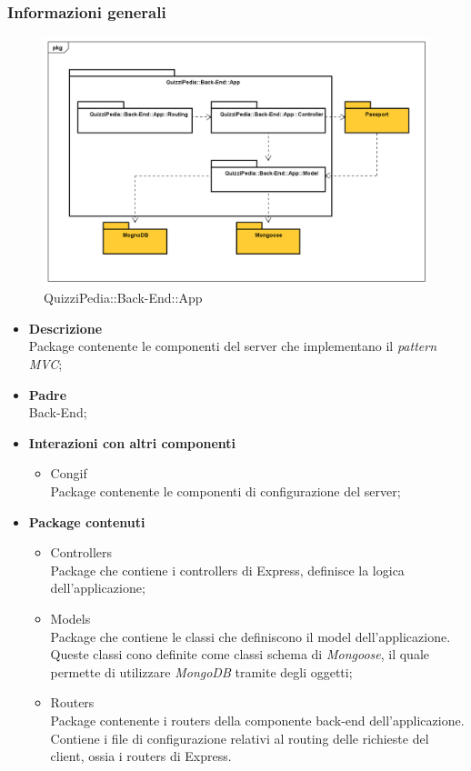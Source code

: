 \subsubsection{Informazioni generali}
\label{QuizziPedia::Back-End::App}
\begin{figure}
	\centering
	\includegraphics[scale=0.45]{UML/Package/QuizziPedia_Back-End_App.png}
	\caption{QuizziPedia::Back-End::App}
\end{figure}
	\begin{itemize}
		\item \textbf{Descrizione} \\
		Package contenente le componenti del server che implementano il \textit{pattern\ped{G} MVC};
		\item \textbf{Padre} \\ Back-End;
		\item \textbf{Interazioni con altri componenti}
			\begin{itemize}
				\item Congif \\
				Package contenente le componenti di configurazione del server;
			\end{itemize}
		\item \textbf{Package contenuti}
			\begin{itemize}
				\item Controllers \\
				Package che contiene i controllers di Express, definisce la logica dell'applicazione;
				\item Models \\
				Package che contiene le classi che definiscono il model dell'applicazione. Queste classi cono definite come classi schema di \textit{Mongoose}, il quale permette di utilizzare \textit{MongoDB} tramite degli oggetti;
				\item Routers \\
				Package contenente i routers della componente back-end dell'applicazione. Contiene i file di configurazione relativi al routing delle richieste del client, ossia i routers di Express.
			\end{itemize}
	\end{itemize}
	
